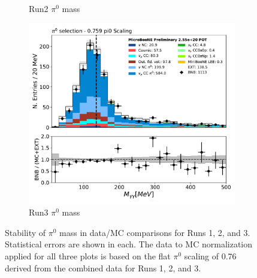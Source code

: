 \documentclass[a4paper]{article}
\begin{document}
\begin{figure}[H]
\begin{center}
\begin{subfigure}[b]{0.3\textwidth}
    \caption{\label{fig:stability:pi0mass:R2} Run2 $\pi^0$ mass}
    \end{subfigure}
    \begin{subfigure}[b]{0.3\textwidth}
    \centering
    \includegraphics[width=1.00\textwidth]{stability/pi0_mass_Y_corrpi0_mass_Y_corr_run3.pdf}
    \caption{\label{fig:stability:pi0mass:R3} Run3 $\pi^0$ mass}
    \end{subfigure}
\caption{\label{fig:stability:pi0eff}Stability of $\pi^0$ mass in data/MC comparisons for Runs 1, 2, and 3. Statistical errors are shown in each. The data to MC normalization applied for all three plots is based on the flat $\pi^0$ scaling of 0.76 derived from the combined data for Runs 1, 2, and 3.}
\end{center}
\end{figure}


\newpage
\end{document}
